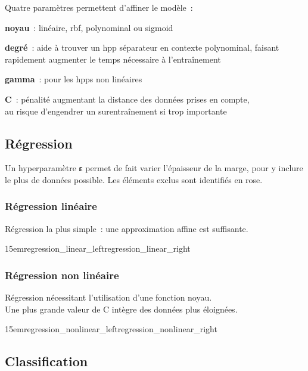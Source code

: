 Quatre paramètres permettent d’affiner le modèle :
\begin{itmz}
\item{\textbf{noyau} : linéaire, \gls{rbf}, polynominal ou \gls{sigmoid}}
\item{\textbf{degré} : aide à trouver un \gls{hpp} séparateur en contexte polynominal,
faisant rapidement augmenter le temps nécessaire à l’entraînement}
\item{\textbf{gamma} : pour les \glspl{hpp} non linéaires}
\item{\textbf{C} : pénalité augmentant la distance des données prises en compte,\\
au risque d’engendrer un surentraînement si trop importante}
\end{itmz}

\pagebreak

\subsection{Régression}

Un hyperparamètre \textbf{ε} permet de fait varier l’épaisseur de la marge,
pour y inclure le plus de données possible.
Les éléments exclus sont identifiés en rose.

\subsubsection{Régression linéaire}

Régression la plus simple : une approximation affine est suffisante.

{15em}{regression_linear_left}{regression_linear_right}

\subsubsection{Régression non linéaire}

Régression nécessitant l’utilisation d’une fonction noyau.\\
Une plus grande valeur de C intègre des données plus éloignées.

{15em}{regression_nonlinear_left}{regression_nonlinear_right}

\pagebreak

\subsection{Classification}

